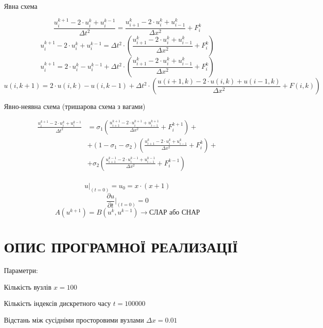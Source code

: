 \documentclass{article}
\begin{document}
        Явна схема

        $$ \frac{u_i^{k+1} - 2 \cdot u_i^{k} + u_i^{k-1}}{\Delta{t}^2} = \frac{u_{i+1}^{k} - 2 \cdot u_i^{k} + u_{i-1}^{k}}{\Delta{x}^2} + F_i^{k} $$
        $$ u_i^{k+1} - 2 \cdot u_i^{k} + u_i^{k-1} = \Delta{t}^2 \cdot \left( \frac{u_{i+1}^{k} - 2 \cdot u_i^{k} + u_{i-1}^{k}}{\Delta{x}^2} + F_i^{k} \right) $$
        $$ u_i^{k+1} = 2 \cdot u_i^{k} - u_i^{k-1} + \Delta{t}^2 \cdot \left( \frac{u_{i+1}^{k} - 2 \cdot u_i^{k} + u_{i-1}^{k}}{\Delta{x}^2} + F_i^{k} \right) $$
        $$ u(i, k+1) = 2 \cdot u(i, k) - u(i, k-1) + \Delta{t}^2 \cdot \left( \frac{u(i+1, k) - 2 \cdot u(i, k) + u(i-1, k)}{\Delta{x}^2} + F(i, k) \right) $$

        Явно-неявна схема (тришарова схема з вагами)

        \begin{equation*}
            \begin{split}
                \frac{u_i^{k+1} - 2 \cdot u_i^{k} + u_i^{k-1}}{\Delta{t}^2} & = \sigma_1 \left( \frac{u_{i+1}^{k+1} - 2 \cdot u_i^{k+1} + u_{i-1}^{k+1}}{\Delta{x}^2} + F_i^{k+1} \right) +\\
                & + (1 - \sigma_1 - \sigma_2) \left( \frac{u_{i+1}^{k} - 2 \cdot u_i^{k} + u_{i-1}^{k}}{\Delta{x}^2} + F_i^{k} \right) +\\
                & + \sigma_2 \left( \frac{u_{i+1}^{k-1} - 2 \cdot u_i^{k-1} + u_{i-1}^{k-1}}{\Delta{x}^2} + F_i^{k-1} \right)\\
            \end{split}
        \end{equation*}

        $$ u \vert_{(t = 0)} = u_0 = x \cdot (x+1) $$
        $$ \frac{\partial{u}}{\partial{t}} \vert_{(t = 0)} = 0 $$
        $$ A\left(u^{k+1}\right) = B\left(u^k, u^{k-1}\right) \rightarrow \text{СЛАР або СНАР} $$

    \newpage
    \section{ОПИС ПРОГРАМНОЇ РЕАЛИЗАЦІЇ}
        Параметри:

        Кількість вузлів $ x = 100 $
        
        Кількість індексів дискретного часу $ t = 100 000 $
        
        Відстань між сусідніми просторовими вузлами $ \Delta{x} = 0.01 $
        
\end{document}
